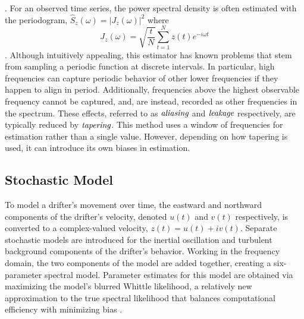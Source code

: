 \documentclass{stat572Style}
\begin{document}
\noindent \citep{Sykulski2013}. For an observed time series, the power spectral density is often estimated with the periodogram, $\hat{S}_{z}(\omega) = |J_{z}(\omega)|^{2}$ where 
\begin{equation}
\label{eq: perio}
J_{z}(\omega) = \sqrt{\frac{t}{N}} \sum_{t=1}^{N} z(t) e^{-i \omega t}
\end{equation}
\citep{Sykulski2013}. 
Although intuitively appealing, this estimator has known problems that stem from  sampling a periodic function at discrete intervals. 
In particular,  high frequencies can  capture periodic behavior of other lower frequencies if they happen to align in period. 
Additionally, frequencies above the highest observable frequency cannot be captured, and, are instead, recorded as other frequencies in the spectrum.  
These effects, referred to as $\textbf{\it{aliasing}}$ and $\textbf{\it{leakage}}$ respectively,  are typically reduced by $\textbf{\it{tapering}}$. This method uses  a window of frequencies for estimation rather than a single value. 
However, depending on how tapering is used, it can introduce its own  biases in estimation.  


\subsection{Stochastic Model}
 To model a drifter's movement over time, the eastward and northward components of the drifter's velocity, denoted $u(t)$ and $v(t)$ respectively, is converted to a complex-valued velocity, $z(t) = u(t) + iv(t)$. 
 Separate stochastic models are introduced for the inertial oscillation and turbulent background components of the drifter's behavior. 
 Working in the frequency domain, the two components of the model are added together, creating a six-parameter spectral model. 
 Parameter estimates for this model are obtained via maximizing the model's blurred Whittle likelihood, a relatively new approximation to the true spectral likelihood that balances computational efficiency with minimizing bias \citep{Sykulski2013}. 
 
\end{document}
